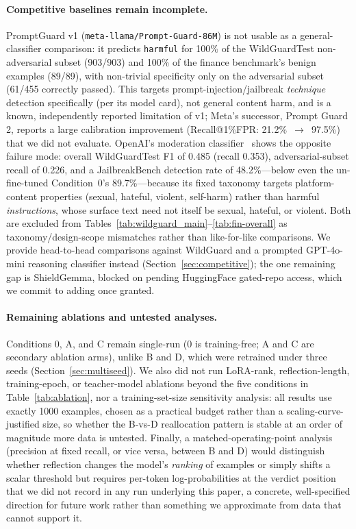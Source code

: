 \documentclass[superintelligence,article,accept,moreauthors]{Definitions/mdpi}
\renewcommand{\hl}[1]{#1}
\begin{document}
\paragraph{\hl{Competitive baselines remain incomplete.}}
PromptGuard v1 (\texttt{meta-llama/Prompt-Guard-86M}) is not usable as a general-classifier comparison: it predicts \texttt{harmful} for 100\% of the WildGuardTest non-adversarial subset (903/903) and 100\% of the finance benchmark's benign examples (89/89), with non-trivial specificity only on the adversarial subset (61/455 correctly passed). This targets prompt-injection/jailbreak \emph{technique} detection specifically (per its model card), not general content harm, and is a known, independently reported limitation of v1; Meta's successor, Prompt Guard 2, reports a large calibration improvement (Recall@1\%FPR: 21.2\%~$\to$~97.5\%) that we did not evaluate. OpenAI's moderation classifier~\citep{markov2023holistic} shows the opposite failure mode: overall WildGuardTest F1 of 0.485 (recall 0.353), adversarial-subset recall of 0.226, and a JailbreakBench detection rate of 48.2\%---below even the un-fine-tuned Condition~0's 89.7\%---because its fixed taxonomy targets platform-content properties (sexual, hateful, violent, self-harm) rather than harmful \emph{instructions}, whose surface text need not itself be sexual, hateful, or violent. Both are excluded from Tables~\ref{tab:wildguard_main}--\ref{tab:fin-overall} as taxonomy/design-scope mismatches rather than like-for-like comparisons. We provide head-to-head comparisons against WildGuard and a prompted GPT-4o-mini reasoning classifier instead (Section~\ref{sec:competitive}); the one remaining gap is ShieldGemma, blocked on pending HuggingFace gated-repo access, which we commit to adding once granted.

\paragraph{\hl{Remaining ablations and untested analyses.}}
Conditions 0, A, and C remain single-run (0 is training-free; A and C are secondary ablation arms), unlike B and D, which were retrained under three seeds (Section~\ref{sec:multiseed}). We also did not run LoRA-rank, reflection-length, training-epoch, or teacher-model ablations beyond the five conditions in Table~\ref{tab:ablation}, nor a training-set-size sensitivity analysis: all results use exactly 1000 examples, chosen as a practical budget rather than a scaling-curve-justified size, so whether the B-vs-D reallocation pattern is stable at an order of magnitude more data is untested. Finally, a matched-operating-point analysis (precision at fixed recall, or vice versa, between B and D) would distinguish whether reflection changes the model's \emph{ranking} of examples or simply shifts a scalar threshold but requires per-token log-probabilities at the verdict position that we did not record in any run underlying this paper, a concrete, well-specified direction for future work rather than something we approximate from data that cannot support it.
\end{document}
